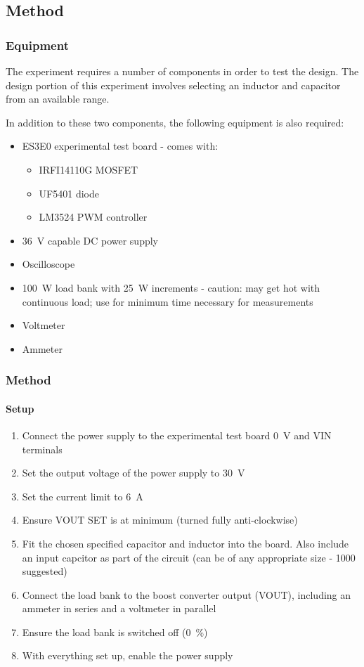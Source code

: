 \subsection{Method}
\subsubsection{Equipment}
The experiment requires a number of components in order to test the design. The design portion of this experiment involves
selecting an inductor and capacitor from an available range.

In addition to these two components, the following equipment is also required:
\begin{itemize}
    \item ES3E0 experimental test board - comes with:
          \begin{itemize}
              \item IRFI14110G MOSFET
              \item UF5401 diode
              \item LM3524 PWM controller
          \end{itemize}
    \item \qty{36}{\volt} capable DC power supply
    \item Oscilloscope
    \item \qty{100}{\watt} load bank with \qty{25}{\watt} increments - caution: may get hot with
          continuous load; use for minimum time necessary for measurements
    \item Voltmeter
    \item Ammeter
\end{itemize}


\subsubsection{Method}
\paragraph{Setup}
\begin{enumerate}
    \item Connect the power supply to the experimental test board \qty{0}{\volt} and VIN terminals
    \item Set the output voltage of the power supply to \qty{30}{\volt}
    \item Set the current limit to \qty{6}{\A}
    \item Ensure VOUT SET is at minimum (turned fully anti-clockwise)
    \item Fit the chosen specified capacitor and inductor into the board. Also include an input capcitor as part of the circuit (can be of any appropriate size - \qty{1000}{\uF} suggested)
    \item Connect the load bank to the boost converter output (VOUT), including an ammeter in series and a voltmeter in parallel
    \item Ensure the load bank is switched off (\qty{0}{\percent})
    \item With everything set up, enable the power supply
\end{enumerate}

